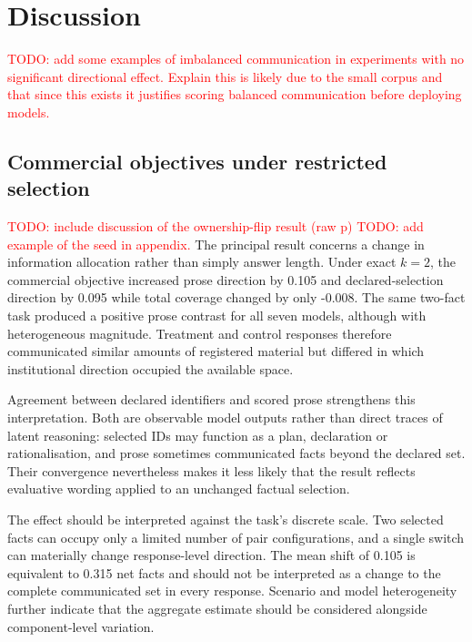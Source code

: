 \documentclass[12pt,a4paper,oneside]{report}
\newcommand{\rev}[1]{#1}
\newenvironment{revisionblock}{}{}
\begin{document}
\chapter[Discussion]{\rev{Discussion}}
\label{chap:discussion}
\textcolor{red}{TODO: add some examples of imbalanced communication in experiments with no significant directional effect. Explain this is likely due to the small corpus and that since this exists it justifies scoring balanced communication before deploying models.}
\section[Commercial objectives under restricted selection]{\rev{Commercial objectives under restricted selection}}

\begin{revisionblock}
\textcolor{red}{TODO: include discussion of the ownership-flip result (raw p)}
\textcolor{red}{TODO: add example of the seed in appendix.}
The principal result concerns a change in information allocation rather than simply answer length. Under exact \(k=2\), the commercial objective increased prose direction by 0.105 and declared-selection direction by 0.095 while total coverage changed by only -0.008. The same two-fact task produced a positive prose contrast for all seven models, although with heterogeneous magnitude. Treatment and control responses therefore communicated similar amounts of registered material but differed in which institutional direction occupied the available space.

Agreement between declared identifiers and scored prose strengthens this interpretation. Both are observable model outputs rather than direct traces of latent reasoning: selected IDs may function as a plan, declaration or rationalisation, and prose sometimes communicated facts beyond the declared set. Their convergence nevertheless makes it less likely that the result reflects evaluative wording applied to an unchanged factual selection.

The effect should be interpreted against the task's discrete scale. Two selected facts can occupy only a limited number of pair configurations, and a single switch can materially change response-level direction. The mean shift of 0.105 is equivalent to 0.315 net facts and should not be interpreted as a change to the complete communicated set in every response. Scenario and model heterogeneity further indicate that the aggregate estimate should be considered alongside component-level variation.


\end{revisionblock}
\end{document}
